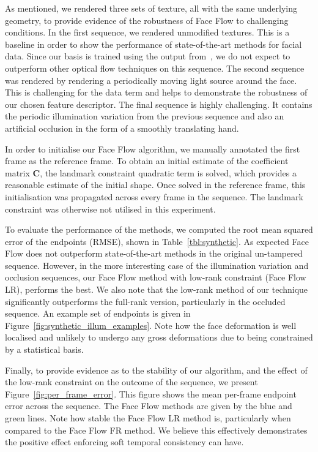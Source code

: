 As mentioned, we rendered three sets of texture, all with the same underlying geometry,
to provide evidence of the robustness of Face Flow to challenging conditions. In the first
sequence, we rendered unmodified textures. This is a baseline
in order to show the performance of state-of-the-art methods for facial data. Since
our basis is trained using the output from~\cite{garg2013variational}, we do not expect to
outperform other optical flow techniques on this sequence. The second sequence
was rendered by rendering a periodically moving light source around the face. This
is challenging for the data term and helps to demonstrate the
robustness of our chosen feature descriptor. The final sequence is highly challenging. It contains
the periodic illumination variation from the previous sequence and also an artificial
occlusion in the form of a smoothly translating hand.

In order to initialise our Face Flow algorithm, we manually annotated the first frame
as the reference frame. To obtain an initial estimate of the coefficient
matrix $\mathbf{C}$, the landmark constraint quadratic term is solved, which
provides a reasonable estimate of the initial shape. Once solved in the reference frame,
this initialisation was propagated across every frame in the sequence. The landmark constraint
was otherwise not utilised in this experiment.

To evaluate the performance of the methods, we computed the root mean squared
error of the endpoints (RMSE), shown in Table~\ref{tbl:synthetic}. As expected
Face Flow does not outperform state-of-the-art methods in the original un-tampered
sequence. However, in the more interesting case of the illumination variation
and occlusion sequences, our Face Flow method with low-rank constraint (Face Flow LR),
performs the best. We also note that the low-rank method of our technique significantly
outperforms the full-rank version, particularly in the occluded sequence. An example
set of endpoints is given in Figure~\ref{fig:synthetic_illum_examples}. Note how
the face deformation is well localised and unlikely to undergo any gross deformations
due to being constrained by a statistical basis.

Finally, to provide evidence as to the stability of our algorithm, and the effect
of the low-rank constraint on the outcome of the sequence, we present Figure~\ref{fig:per_frame_error}.
This figure shows the mean per-frame endpoint error across the sequence. The Face Flow
methods are given by the blue and green lines. Note how stable the Face Flow LR method is,
particularly when compared to the Face Flow FR method. We believe this effectively
demonstrates the positive effect enforcing soft temporal consistency can have.
